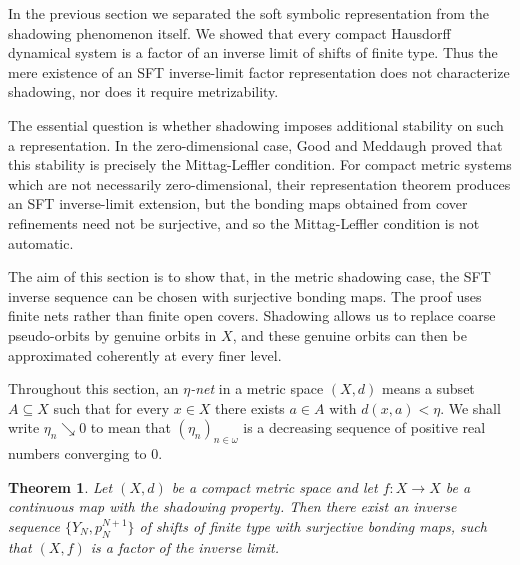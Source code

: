 \documentclass[12pt]{amsart}
\newtheorem{theorem}{Theorem}[section]
\theoremstyle{definition}
\numberwithin{equation}{section}
\theoremstyle{remark}
\begin{document}
In the previous section we separated the soft symbolic representation from the
shadowing phenomenon itself. We showed that every compact Hausdorff dynamical
system is a factor of an inverse limit of shifts of finite type. Thus the mere
existence of an SFT inverse-limit factor representation does not characterize
shadowing, nor does it require metrizability.

The essential question is whether shadowing imposes additional stability on such
a representation. In the zero-dimensional case, Good and Meddaugh proved that
this stability is precisely the Mittag-Leffler condition. For compact metric
systems which are not necessarily zero-dimensional, their representation theorem
produces an SFT inverse-limit extension, but the bonding maps obtained from
cover refinements need not be surjective, and so the Mittag-Leffler condition is
not automatic.

The aim of this section is to show that, in the metric shadowing case, the SFT
inverse sequence can be chosen with surjective bonding maps. The proof uses
finite nets rather than finite open covers. Shadowing allows us to replace
coarse pseudo-orbits by genuine orbits in $X$, and these genuine orbits can then
be approximated coherently at every finer level. 

Throughout this section, an \emph{$\eta$-net} in a metric space $(X,d)$ means a
 subset $A\subseteq X$ such that for every $x\in X$ there exists
$a\in A$ with $d(x,a)<\eta$. We shall write $\eta_n\searrow 0$
to mean that $(\eta_n)_{n\in\omega}$ is a decreasing sequence of positive real
numbers converging to $0$.



\begin{theorem}\label{Zero-ext}
Let $(X,d)$ be a compact metric space and let $f:X\to X$ be a continuous map with the shadowing property. Then there exist an inverse sequence $\{Y_N, p^{N+1}_N\}$ of shifts of finite type with surjective bonding maps, such that $(X, f)$ is a factor of the inverse limit.
\end{theorem}
\end{document}
